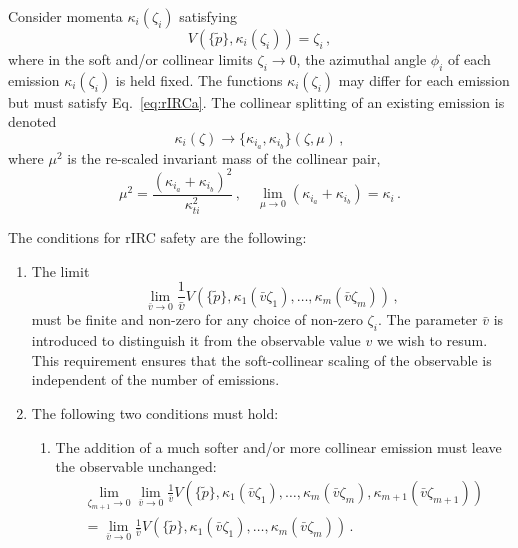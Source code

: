 \begin{enumerate}
Consider momenta $\kappa_i(\zeta_i)$ satisfying 
\begin{equation}
\label{eq:rIRCa}
	V(\{\tilde{p}\},\kappa_i(\zeta_i))=\zeta_i\,,
\end{equation}
where in the soft and/or collinear limits $\zeta_i\to0$, the azimuthal angle $\phi_i$ of each emission $\kappa_i(\zeta_i)$ is held fixed. The functions $\kappa_i(\zeta_i)$ may differ for each emission but must satisfy Eq.~\eqref{eq:rIRCa}.
The collinear splitting of an existing emission is denoted 
\begin{equation}
	\kappa_i(\zeta)\to\{\kappa_{i_a},\kappa_{i_b}\}(\zeta,\mu)\,,
\end{equation}
where $\mu^2$ is the re-scaled invariant mass of the collinear pair, 
\begin{equation}
	\mu^2=\frac{(\kappa_{i_a}+\kappa_{i_b})^2}{\kappa_{ti}^2}\,,\quad \lim_{\mu\to0}(\kappa_{i_a}+\kappa_{i_b})=\kappa_{i}\,.
\end{equation}

The conditions for rIRC safety are the following:
\begin{enumerate}
\item \label{cond:rIRC-a} The limit 
\begin{equation}
\label{eq:rIRC-a}
\lim_{\bar{v}\to0}\frac{1}{\bar{v}}V(\{\tilde{p}\},\kappa_1(\bar{v}\zeta_1),\dots,\kappa_m(\bar{v}\zeta_m))\,,
\end{equation}
must be finite and non-zero for any choice of non-zero $\zeta_i$. 
The parameter  $\bar{v}$ is introduced to distinguish it from the observable
value $v$ we wish to resum. This requirement ensures that the
 soft-collinear scaling of the observable is independent of the number
 of emissions.
	
\item The following two conditions must hold:
\begin{enumerate}
\item The addition of a much softer and/or more collinear emission
        must leave the observable unchanged:
\begin{multline}
\label{eq:rIRC-b-i}
\lim_{\zeta_{m+1}\to0}\lim_{\bar{v}\to0}\frac{1}{\bar{v}}
V(\{\tilde{p}\},\kappa_1(\bar{v}\zeta_1),\dots,\kappa_m(\bar{v}\zeta_m),
\kappa_{m+1}(\bar{v}\zeta_{m+1}))\\
=\lim_{\bar{v}\to0}\frac{1}{\bar{v}}V(\{\tilde{p}\},\kappa_1(\bar{v}\zeta_1),\dots,
\kappa_m(\bar{v}\zeta_m))\,.
\end{multline}


\end{enumerate}
\end{enumerate}
\end{enumerate}
